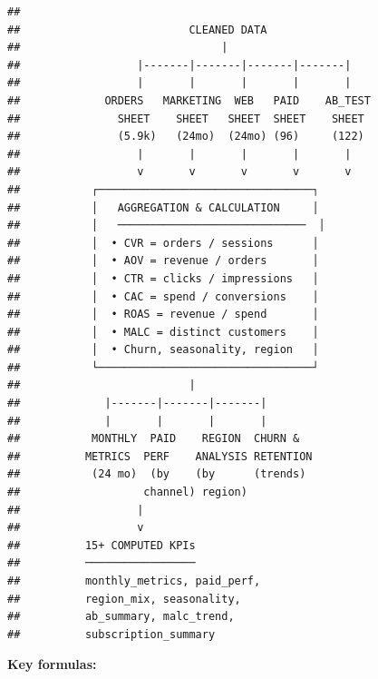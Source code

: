 \documentclass[
  11pt,
]{article}
\begin{document}
\begin{verbatim}
## 
##                          CLEANED DATA
##                               |
##                  |-------|-------|-------|-------|
##                  |       |       |       |       |
##             ORDERS   MARKETING  WEB   PAID    AB_TEST
##               SHEET    SHEET   SHEET  SHEET    SHEET
##               (5.9k)   (24mo)  (24mo) (96)     (122)
##                  |       |       |       |       |
##                  v       v       v       v       v
##           ┌─────────────────────────────────┐
##           │   AGGREGATION & CALCULATION     │
##           │   ─────────────────────────────  │
##           │  • CVR = orders / sessions      │
##           │  • AOV = revenue / orders       │
##           │  • CTR = clicks / impressions   │
##           │  • CAC = spend / conversions    │
##           │  • ROAS = revenue / spend       │
##           │  • MALC = distinct customers    │
##           │  • Churn, seasonality, region   │
##           └─────────────────────────────────┘
##                          |
##             |-------|-------|-------|
##             |       |       |       |
##           MONTHLY  PAID    REGION  CHURN &
##          METRICS  PERF    ANALYSIS RETENTION
##           (24 mo)  (by    (by      (trends)
##                   channel) region)
##                  |
##                  v
##          15+ COMPUTED KPIs
##          ─────────────────
##          monthly_metrics, paid_perf,
##          region_mix, seasonality,
##          ab_summary, malc_trend,
##          subscription_summary
\end{verbatim}

\textbf{Key formulas:}
\end{document}
